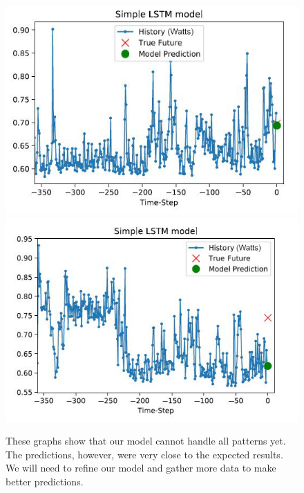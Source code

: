 \documentclass[conference]{IEEEtran}
\begin{document}
\begin{figure}[htbp]
    \includegraphics[width=\linewidth]{img/prediction02.jpg}
    \includegraphics[width=\linewidth]{img/prediction03.jpg}
    \caption{These graphs show that our model cannot handle all patterns yet. The predictions, however, were very close to the expected results. We will need to refine our model and gather more data to make better predictions.}
    \label{fig:prediction02}
\end{figure}
\end{document}
